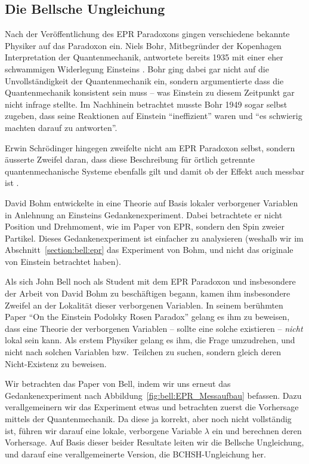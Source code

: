 \begin{refsection}
\section{Die Bellsche Ungleichung\label{section:bell:bell}}
Nach der Ver\"offentlichung des EPR Paradoxons gingen verschiedene bekannte
Physiker auf das Paradoxon ein.
Niels Bohr, Mitbegr\"under der Kopenhagen Interpretation der Quantenmechanik,
antwortete bereits 1935 mit einer eher schwammigen Widerlegung Einsteins
\cite{Bell:Bohr1935}.
Bohr ging dabei gar nicht auf die Unvollst\"andigkeit der Quantenmechanik ein,
sondern argumentierte dass die Quantenmechanik konsistent sein muss -- was
Einstein zu diesem Zeitpunkt gar nicht infrage stellte.
Im Nachhinein betrachtet musste Bohr 1949 sogar selbst zugeben, dass seine
Reaktionen auf Einstein \enquote{ineffizient} waren und 
\enquote{es schwierig machten darauf zu antworten}. 

Erwin Schr\"odinger hingegen zweifelte nicht am EPR Paradoxon selbst, sondern
\"ausserte Zweifel daran, dass diese Beschreibung f\"ur \"ortlich getrennte
quantenmechanische Systeme ebenfalls gilt und damit ob der Effekt auch
messbar ist \cite{Bell:Schroedinger1936}.

David Bohm entwickelte in \cite{Bell:Bohm1952} eine Theorie auf Basis
lokaler verborgener Variablen in Anlehnung an Einsteins Gedankenexperiment.
Dabei betrachtete er nicht  Position und Drehmoment, wie im Paper von EPR,
sondern den Spin zweier Partikel.
Dieses Gedankenexperiment ist einfacher zu analysieren (weshalb wir im
Abschnitt~\ref{section:bell:epr} das Experiment von Bohm, und nicht das
originale von Einstein betrachtet haben).

Als sich John Bell noch als Student mit dem EPR Paradoxon und insbesondere
der Arbeit von David Bohm zu besch\"aftigen begann, kamen ihm insbesondere
Zweifel an der Lokalit\"at dieser verborgenen Variablen.
In seinem ber\"uhmten Paper
\enquote{On the Einstein Podolsky Rosen Paradox} \cite{Bell:Bell1964}
gelang es ihm zu beweisen, dass eine Theorie der verborgenen Variablen -- sollte
eine solche existieren -- \emph{nicht} lokal sein kann.
Als erstem Physiker gelang es ihm, die Frage umzudrehen, und nicht nach solchen
Variablen bzw.~Teilchen zu suchen, sondern gleich deren Nicht-Existenz
zu beweisen.

Wir betrachten das Paper von Bell, indem wir uns erneut das Gedankenexperiment 
nach Abbildung~\ref{fig:bell:EPR_Messaufbau} befassen.
Dazu verallgemeinern wir das Experiment etwas und betrachten zuerst die
Vorhersage mittels der Quantenmechanik.
Da diese ja korrekt, aber noch nicht vollst\"andig ist, f\"uhren wir darauf
eine lokale, verborgene Variable $\lambda$ ein und berechnen deren Vorhersage.
Auf Basis dieser beider Resultate leiten wir die Bellsche Ungleichung, und
darauf eine verallgemeinerte Version, die BCHSH-Ungleichung her.


\end{refsection}
